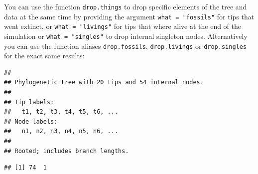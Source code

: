 \documentclass[
]{book}
\newenvironment{Shaded}{\begin{snugshade}}{\end{snugshade}}
\newcommand{\CommentTok}[1]{\textcolor[rgb]{0.56,0.35,0.01}{\textit{#1}}}
\newcommand{\DataTypeTok}[1]{\textcolor[rgb]{0.13,0.29,0.53}{#1}}
\newcommand{\DecValTok}[1]{\textcolor[rgb]{0.00,0.00,0.81}{#1}}
\newcommand{\FloatTok}[1]{\textcolor[rgb]{0.00,0.00,0.81}{#1}}
\newcommand{\KeywordTok}[1]{\textcolor[rgb]{0.13,0.29,0.53}{\textbf{#1}}}
\newcommand{\NormalTok}[1]{#1}
\newcommand{\OperatorTok}[1]{\textcolor[rgb]{0.81,0.36,0.00}{\textbf{#1}}}
\newcommand{\StringTok}[1]{\textcolor[rgb]{0.31,0.60,0.02}{#1}}
\begin{document}
You can use the function \texttt{drop.things} to drop specific elements of the tree and data at the same time by providing the argument \texttt{what\ =\ "fossils"} for tips that went extinct, or \texttt{what\ =\ "livings"} for tips that where alive at the end of the simulation or \texttt{what\ =\ "singles"} to drop internal singleton nodes.
Alternatively you can use the function aliases \texttt{drop.fossils}, \texttt{drop.livings} or \texttt{drop.singles} for the exact same results:

\begin{Shaded}
\end{Shaded}

\begin{verbatim}
## 
## Phylogenetic tree with 20 tips and 54 internal nodes.
## 
## Tip labels:
##   t1, t2, t3, t4, t5, t6, ...
## Node labels:
##   n1, n2, n3, n4, n5, n6, ...
## 
## Rooted; includes branch lengths.
\end{verbatim}

\begin{Shaded}
\end{Shaded}

\begin{verbatim}
## [1] 74  1
\end{verbatim}

\begin{Shaded}
\end{Shaded}
\end{document}
